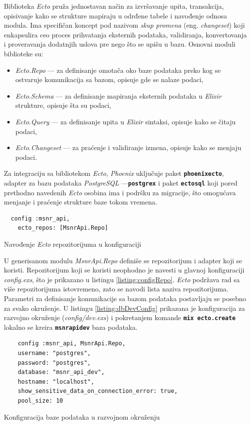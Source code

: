 \documentclass[12pt,oneside]{memoir}
\begin{document}
Biblioteka \emph{Ecto} pruža jednostavan način za izvršavanje upita, transakcija, opisivanje kako se strukture mapiraju
u odrđene tabele i navođenje odnosa modula. Ima specifičan koncept pod nazivom \emph{skup promena} (eng. \emph{changeset}) koji enkapsulira ceo
proces prihvatanja eksternih podataka, validiranja, konvertovanja i proveravanja dodatnjih uslova pre nego što se upišu u bazu. Osnovni moduli biblioteke su:
\begin{itemize}
  \item \emph{Ecto.Repo} --- za definisanje omotača oko baze podataka preko kog se ostvaruje komunikacija sa bazom, opisuje gde se nalaze podaci,
  \item \emph{Ecto.Schema} --- za definisanje mapiranja eksternih podataka u \emph{Elixir} strukture, opisuje šta su podaci,
  \item \emph{Ecto.Query} --- za definisanje upita u \emph{Elixir} sintaksi, opisuje kako se čitaju podaci,
  \item \emph{Ecto.Changeset} --- za praćenje i validiranje izmena, opisuje kako se menjaju podaci.
\end{itemize}
Za integraciju sa bibliotekom \emph{Ecto}, \emph{Phoenix} uključuje paket \texttt{\textbf{phoenix{\textunderscore}ecto}},
adapter za bazu podataka \emph{PostgreSQL} ---\texttt{\textbf{postgrex}} i paket \texttt{\textbf{ecto{\textunderscore}sql}}
koji pored prethodno navedenih \emph{Ecto} osobina ima i podršku za migracije, što omogućava menjanje i praćenje strukture
baze tokom vremena.
\begin{listing}[!h]
  \begin{verbatim}
  config :msnr_api,
    ecto_repos: [MsnrApi.Repo]
\end{verbatim}
\caption{Navođenje \emph{Ecto} repozitorijuma u konfiguraciji}
\label{listing:configRepo}
\end{listing}
U generisanom modulu \emph{MsnrApi.Repo} definiše se repozitorijum i adapter koji se koristi. Repozitorijum koji se koristi neophodno je navesti u
glavnoj konfiguraciji \emph{config.exs}, što je prikazano u listingu \ref{listing:configRepo}. \emph{Ecto} podržava rad sa više repozitorijuma istovremeno, 
zato se navodi lista naziva repozitorijuma. Parametri za definisanje komunikacije sa bazom podataka postavljaju se posebno za svako okruženje.
U listingu \ref{listing:dbDevConfig} prikazana je konfiguracija za razvojno okruženje (\emph{config/dev.exs}) i pokretanjem komande
\texttt{\textbf{mix ecto.create}} lokalno se kreira \texttt{\textbf{msnr{\textunderscore}api{\textunderscore}dev}} baza podataka. 
\begin{listing}[!h]
  \begin{verbatim}
    config :msnr_api, MsnrApi.Repo,
    username: "postgres",
    password: "postgres",
    database: "msnr_api_dev",
    hostname: "localhost",
    show_sensitive_data_on_connection_error: true,
    pool_size: 10
\end{verbatim}
\caption{Konfiguracija baze podataka u razvojnom okruženju}
\label{listing:dbDevConfig}
\end{listing}
\end{document}
